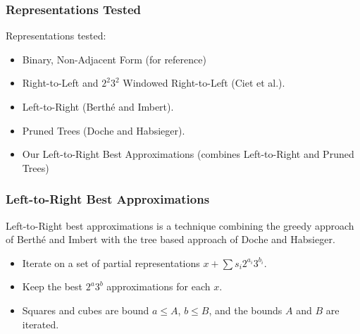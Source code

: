 \documentclass{beamer}
\begin{document}
\begin{frame}
\frametitle{Representations Tested}
Representations tested:
\begin{itemize}
\item Binary, Non-Adjacent Form (for reference)
\item Right-to-Left and $2^2 3^2$ Windowed Right-to-Left (Ciet et al.).
\item Left-to-Right (Berth{\'e} and Imbert).
\item Pruned Trees (Doche and Habsieger).
\item Our Left-to-Right Best Approximations \break (combines Left-to-Right and Pruned Trees)
\end{itemize}
\end{frame}

\begin{frame}
\frametitle{Left-to-Right Best Approximations}
Left-to-Right best approximations is a technique combining the greedy approach of Berth{\'e} and Imbert with the tree based approach of Doche and Habsieger.
\begin{itemize}
\item Iterate on a set of partial representations $x + \sum s_i2^{a_i}3^{b_i}$.
\item Keep the best $2^a 3^b$ approximations for each $x$.
\item Squares and cubes are bound $a \le A$, $b \le B$, and the bounds $A$ and $B$ are iterated.
\end{itemize}
\end{frame}
\end{document}

